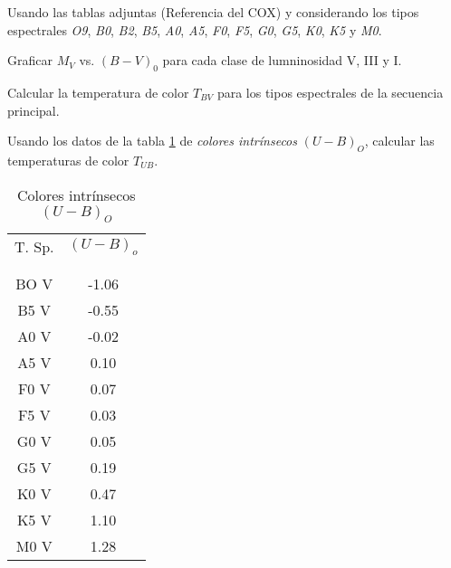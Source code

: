 \documentclass[12pt,a4paper]{practice}
\begin{document}
    \begin{problem}\label{prob:6}
        Usando las tablas adjuntas (Referencia del COX) y considerando los tipos espectrales \emph{O9}, \emph{B0}, \emph{B2}, \emph{B5}, \emph{A0}, \emph{A5}, \emph{F0}, \emph{F5}, \emph{G0}, \emph{G5}, \emph{K0}, \emph{K5} y \emph{M0}.

        \begin{problempart}\label{prob:6:a}
            Graficar $M_V$ vs. $\left(B-V\right)_{0}$ para cada clase de lumninosidad V, III y I.
        \end{problempart}

        \begin{problempart}\label{prob:6:b}
            Calcular la temperatura de color $T_{BV}$ para los tipos espectrales de la secuencia principal.
        \end{problempart}

        \begin{problempart}\label{prob:6:c}
            Usando los datos de la tabla \ref{table:2} de \emph{colores intrínsecos} $\left(U-B\right)_O$, calcular las temperaturas de color $T_{UB}$.
        \end{problempart}

        \begin{table}[h!]
            \centering
            \begin{tabular}{c | c}
                T. Sp.  & $\left(U-B\right)_{o}$ \\
                &  \\[-0.8em]\hline
                &  \\[-0.8em]
                BO V  & -1.06 \\
                B5 V  & -0.55 \\
                A0 V  & -0.02 \\
                A5 V  &  0.10 \\
                F0 V  &  0.07 \\
                F5 V  &  0.03 \\
                G0 V  &  0.05 \\
                G5 V  &  0.19 \\
                K0 V  &  0.47 \\
                K5 V  &  1.10 \\
                M0 V  &  1.28 \\
                \hline
            \end{tabular}
            \caption{
                Colores intrínsecos $\left(U-B\right)_O$
            }\label{table:2}
        \end{table}


\end{problem}
\end{document}
